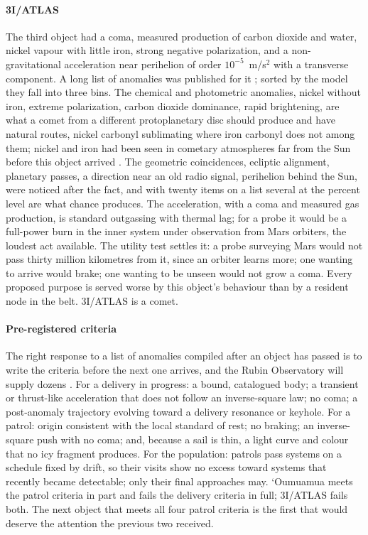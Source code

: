 \documentclass[preprint,12pt]{elsarticle}
\theoremstyle{definition}
\begin{document}
\paragraph{3I/ATLAS} The third object had a coma, measured production of carbon dioxide and water, nickel vapour with little iron, strong negative polarization, and a non-gravitational acceleration near perihelion of order $10^{-5}$~m/s$^2$ with a transverse component. A long list of anomalies was published for it \citep{Loeb2025}; sorted by the model they fall into three bins. The chemical and photometric anomalies, nickel without iron, extreme polarization, carbon dioxide dominance, rapid brightening, are what a comet from a different protoplanetary disc should produce and have natural routes, nickel carbonyl sublimating where iron carbonyl does not among them; nickel and iron had been seen in cometary atmospheres far from the Sun before this object arrived \citep{Manfroid2021}. The geometric coincidences, ecliptic alignment, planetary passes, a direction near an old radio signal, perihelion behind the Sun, were noticed after the fact, and with twenty items on a list several at the percent level are what chance produces. The acceleration, with a coma and measured gas production, is standard outgassing with thermal lag; for a probe it would be a full-power burn in the inner system under observation from Mars orbiters, the loudest act available. The utility test settles it: a probe surveying Mars would not pass thirty million kilometres from it, since an orbiter learns more; one wanting to arrive would brake; one wanting to be unseen would not grow a coma. Every proposed purpose is served worse by this object's behaviour than by a resident node in the belt. 3I/ATLAS is a comet.

\paragraph{Pre-registered criteria} The right response to a list of anomalies compiled after an object has passed is to write the criteria before the next one arrives, and the Rubin Observatory will supply dozens \citep{Ivezic2019}. For a delivery in progress: a bound, catalogued body; a transient or thrust-like acceleration that does not follow an inverse-square law; no coma; a post-anomaly trajectory evolving toward a delivery resonance or keyhole. For a patrol: origin consistent with the local standard of rest; no braking; an inverse-square push with no coma; and, because a sail is thin, a light curve and colour that no icy fragment produces. For the population: patrols pass systems on a schedule fixed by drift, so their visits show no excess toward systems that recently became detectable; only their final approaches may. `Oumuamua meets the patrol criteria in part and fails the delivery criteria in full; 3I/ATLAS fails both. The next object that meets all four patrol criteria is the first that would deserve the attention the previous two received.
\end{document}
